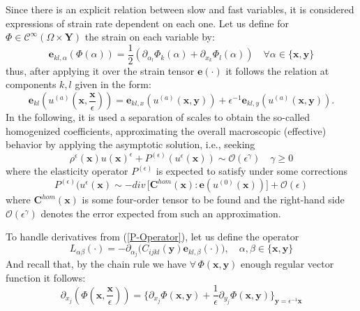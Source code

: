 Since there is an explicit relation between slow and fast variables, it is considered expressions of strain rate dependent on each one. Let us define for $\Phi \in \mathcal{C}^{\infty}(\Omega \times \mathbf{Y})$ the strain on each variable by:
\begin{equation*}
    \mathbf{e}_{kl,\alpha} (\Phi(\alpha)) = \frac{1}{2}(\partial_{\alpha_l} \Phi_k (\alpha) + \partial_{x_k} \Phi_l (\alpha)) \quad \forall \alpha \in \{\mathbf{x}, \mathbf{y}\}
\end{equation*}
thus, after applying it over the strain tensor $\mathbf{e}(\cdot)$ it follows the relation at components $k,l$ given in the form:
\begin{equation}
    \label{Multiscale-Strain}
    \mathbf{e}_{kl} ( u^{(a)}(\mathbf{x}, \frac{\mathbf{x}}{\epsilon})) = \mathbf{e}_{kl,x}( u^{(a)} (\mathbf{x},\mathbf{y})) + \epsilon^{-1} \mathbf{e}_{kl,y} (u^{(a)}(\mathbf{x},\mathbf{y})).
\end{equation}
In the following, it is used a separation of scales to obtain the so-called homogenized coefficients, approximating the overall macroscopic (effective) behavior by applying the asymptotic solution, i.e., seeking
\begin{equation*}
    \rho^{\epsilon}(\mathbf{x}) u(\mathbf{x})^{\epsilon} + P^{(\epsilon)}(u^{\epsilon}(\mathbf{x})) \sim \mathcal{O}(\epsilon^{\gamma}) \quad \gamma \geq 0
\end{equation*}
where the elasticity operator $P^{(\epsilon)}$ is expected to satisfy under some corrections
\begin{equation}
    \label{P-Operator}
    P^{(\epsilon)}(u^{\epsilon}(\mathbf{x}) \sim - div \, \big[\mathbf{C}^{hom}(\mathbf{x}): \mathbf{e}(u^{(0)}(\mathbf{x}))\big] + \mathcal{O}(\epsilon)
\end{equation}
where $\mathbf{C}^{hom}(\mathbf{x})$ is some four-order tensor to be found and the right-hand side $\mathcal{O}(\epsilon^{\gamma})$ denotes the error expected from such an approximation. 

To handle derivatives from (\ref{P-Operator}), let us define the operator 
\begin{equation*}
    L_{\alpha \beta} (\cdot) = - \partial_{\alpha_j} \big( C_{ijkl} (\mathbf{y}) \mathbf{e}_{kl, \beta}(\cdot) \big), \quad \alpha, \beta \in \{ \mathbf{x},\mathbf{y} \}
\end{equation*}
And recall that, by the chain rule we have $\forall \, \Phi(\mathbf{x},\mathbf{y})$ enough regular vector function it follows:
\begin{equation*}
    \partial_{x_j} (\Phi (\mathbf{x}, \frac{\mathbf{x}}{\epsilon})) = \big \{ \partial_{x_j} \Phi (\mathbf{x}, \mathbf{y}) + \frac{1}{\epsilon} \partial_{y_j} \Phi(\mathbf{x},\mathbf{y}) \big \}_{\mathbf{y}= \epsilon^{-1}\mathbf{x}}
\end{equation*}

